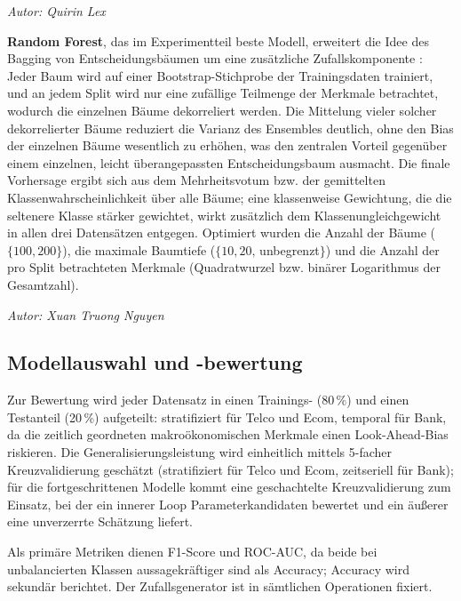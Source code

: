 \documentclass[10pt]{scrartcl}
\begin{document}
\begin{flushright}\textit{Autor: Quirin Lex}\end{flushright}

\textbf{Random Forest}, das im Experimentteil beste Modell, erweitert die Idee des Bagging von Entscheidungsbäumen um eine zusätzliche Zufallskomponente \cite{Breiman2001}: Jeder Baum wird auf einer Bootstrap-Stichprobe der Trainingsdaten trainiert, und an jedem Split wird nur eine zufällige Teilmenge der Merkmale betrachtet, wodurch die einzelnen Bäume dekorreliert werden. Die Mittelung vieler solcher dekorrelierter Bäume reduziert die Varianz des Ensembles deutlich, ohne den Bias der einzelnen Bäume wesentlich zu erhöhen, was den zentralen Vorteil gegenüber einem einzelnen, leicht überangepassten Entscheidungsbaum ausmacht. Die finale Vorhersage ergibt sich aus dem Mehrheitsvotum bzw. der gemittelten Klassenwahrscheinlichkeit über alle Bäume; eine klassenweise Gewichtung, die die seltenere Klasse stärker gewichtet, wirkt zusätzlich dem Klassenungleichgewicht in allen drei Datensätzen entgegen. Optimiert wurden die Anzahl der Bäume ($\{100, 200\}$), die maximale Baumtiefe ($\{10, 20,\,$unbegrenzt$\}$) und die Anzahl der pro Split betrachteten Merkmale (Quadratwurzel bzw. binärer Logarithmus der Gesamtzahl).

\begin{flushright}\textit{Autor: Xuan Truong Nguyen}\end{flushright}

\subsection{Modellauswahl und -bewertung}
\label{sec:model-selection}

Zur Bewertung wird jeder Datensatz in einen Trainings- (80\,\%) und einen Testanteil (20\,\%) aufgeteilt: stratifiziert für Telco und Ecom, temporal für Bank, da die zeitlich geordneten makroökonomischen Merkmale einen Look-Ahead-Bias riskieren. Die Generalisierungsleistung wird einheitlich mittels 5-facher Kreuzvalidierung geschätzt (stratifiziert für Telco und Ecom, zeitseriell für Bank); für die fortgeschrittenen Modelle kommt eine geschachtelte Kreuzvalidierung zum Einsatz, bei der ein innerer Loop Parameterkandidaten bewertet und ein äußerer eine unverzerrte Schätzung liefert.

Als primäre Metriken dienen F1-Score und ROC-AUC, da beide bei unbalancierten Klassen aussagekräftiger sind als Accuracy; Accuracy wird sekundär berichtet. Der Zufallsgenerator ist in sämtlichen Operationen fixiert.
\end{document}
